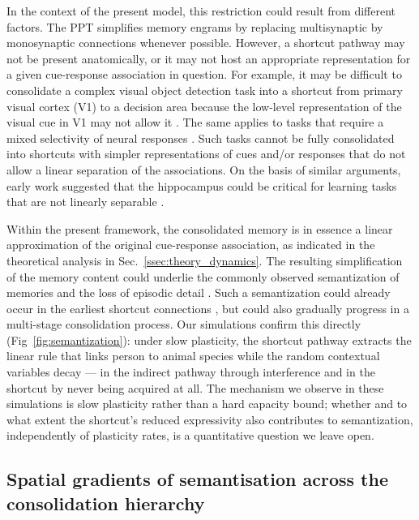 In the context of the present model, this restriction could result from different factors.
The PPT simplifies memory engrams by replacing multisynaptic by monosynaptic connections whenever possible.
However, a shortcut pathway may not be present anatomically, or it may not host an appropriate representation for a given cue-response association in question.
For example, it may be difficult to consolidate a complex visual object detection task into a shortcut from primary visual cortex (V1) to a decision area because the low-level representation of the visual cue in V1 may not allow it \cite{DiCarlo2007, Majaj2015}.
The same applies to tasks that require a mixed selectivity of neural responses \cite{Rigotti2013}. Such tasks cannot be fully consolidated into shortcuts with simpler representations of cues and/or responses that do not allow a linear separation of the associations. On the basis of similar arguments, early work suggested that the hippocampus could be critical for learning tasks that are not linearly separable \cite{Sutherland1989}.

Within the present framework, the consolidated memory is in essence a linear approximation of the original cue-response association, as indicated in the theoretical analysis in Sec.~\ref{ssec:theory_dynamics}.
The resulting simplification of the memory content could underlie the commonly observed semantization of memories and the loss of episodic detail \cite{Winocur2010, Winocur2011}. Such a semantization could already occur in the earliest shortcut connections \cite{Schapiro2017}, but could also gradually progress in a multi-stage consolidation process. Our simulations confirm this directly (Fig~\ref{fig:semantization}): under slow plasticity, the shortcut pathway extracts the linear rule that links person to animal species while the random contextual variables decay --- in the indirect pathway through interference and in the shortcut by never being acquired at all. The mechanism we observe in these simulations is slow plasticity rather than a hard capacity bound; whether and to what extent the shortcut's reduced expressivity also contributes to semantization, independently of plasticity rates, is a quantitative question we leave open.

\subsection{Spatial gradients of semantisation across the consolidation hierarchy}
\label{ssec:semantization_gradient}

